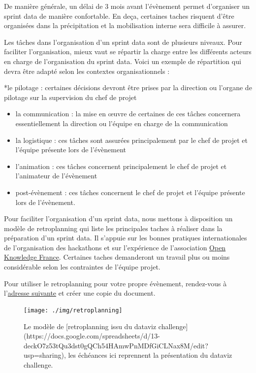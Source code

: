 \documentclass[]{book}
\begin{document}
De manière générale, un délai de 3 mois avant l'évènement permet
d'organiser un sprint data de manière confortable. En deça, certaines
taches risquent d'être organisées dans la précipitation et la
mobilisation interne sera difficile à assurer.

Les tâches dans l'organisation d'un sprint data sont de plusieurs
niveaux. Pour faciliter l'organisation, mieux vaut se répartir la charge
entre les différents acteurs en charge de l'organisation du sprint data.
Voici un exemple de répartition qui devra être adapté selon les
contextes organisationnels :

*le pilotage : certaines décisions devront être prises par la direction
ou l'organe de pilotage sur la supervision du chef de projet

\begin{itemize}
\item
  la communication : la mise en œuvre de certaines de ces tâches
  concernera essentiellement la direction ou l'équipe en charge de la
  communication
\item
  la logistique : ces tâches sont assurées principalement par le chef de
  projet et l'équipe présente lors de l'évènement
\item
  l'animation : ces tâches concernent principalement le chef de projet
  et l'animateur de l'évènement
\item
  post-évènement : ces tâches concernent le chef de projet et l'équipe
  présente lors de l'évènement.
\end{itemize}

Pour faciliter l'organisation d'un sprint data, nous mettons à
disposition un modèle de retroplanning qui liste les principales taches
à réaliser dans la préparation d'un sprint data. Il s'appuie sur les
bonnes pratiques internationales de l'organisation des hackathons et sur
l'expérience de l'association \href{okfn.fr}{Open Knowledge France}.
Certaines taches demanderont un travail plus ou moins considérable selon
les contraintes de l'équipe projet.

Pour utiliser le retroplanning pour votre propre évènement, rendez-vous
à
l'\href{https://docs.google.com/spreadsheets/d/13-deckO7z53tQu3dst0gQCh54HAmwPnMDfGiCLNax8M/edit?usp=sharing}{adresse
suivante} et créer une copie du document.

\begin{figure}

{\centering \texttt{[image: ./img/retroplanning]} 

}

\caption{Le modèle de [retroplanning issu du dataviz challenge](https://docs.google.com/spreadsheets/d/13-deckO7z53tQu3dst0gQCh54HAmwPnMDfGiCLNax8M/edit?usp=sharing), les échéances ici reprennent la présentation du dataviz challenge.}\label{fig:unnamed-chunk-14}
\end{figure}
\end{document}
